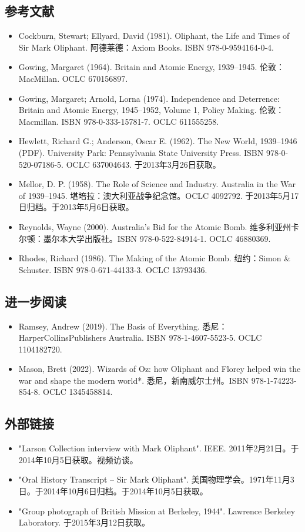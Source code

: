 \subsection{参考文献}
\begin{itemize}
\item Cockburn, Stewart; Ellyard, David (1981). Oliphant, the Life and Times of Sir Mark Oliphant. 阿德莱德：Axiom Books. ISBN 978-0-9594164-0-4.
\item Gowing, Margaret (1964). Britain and Atomic Energy, 1939–1945. 伦敦：MacMillan. OCLC 670156897.
\item Gowing, Margaret; Arnold, Lorna (1974). Independence and Deterrence: Britain and Atomic Energy, 1945–1952, Volume 1, Policy Making. 伦敦：Macmillan. ISBN 978-0-333-15781-7. OCLC 611555258.
\item Hewlett, Richard G.; Anderson, Oscar E. (1962). The New World, 1939–1946 (PDF). University Park: Pennsylvania State University Press. ISBN 978-0-520-07186-5. OCLC 637004643. 于2013年3月26日获取。
\item Mellor, D. P. (1958). The Role of Science and Industry. Australia in the War of 1939–1945. 堪培拉：澳大利亚战争纪念馆。OCLC 4092792. 于2013年5月17日归档。于2013年5月6日获取。
\item Reynolds, Wayne (2000). Australia's Bid for the Atomic Bomb. 维多利亚州卡尔顿：墨尔本大学出版社。ISBN 978-0-522-84914-1. OCLC 46880369.
\item Rhodes, Richard (1986). The Making of the Atomic Bomb. 纽约：Simon & Schuster. ISBN 978-0-671-44133-3. OCLC 13793436.
\end{itemize}
\subsection{进一步阅读}
\begin{itemize}
\item Ramsey, Andrew (2019). The Basis of Everything. 悉尼：HarperCollinsPublishers Australia. ISBN 978-1-4607-5523-5. OCLC 1104182720.
\item Mason, Brett (2022). Wizards of Oz: how Oliphant and Florey helped win the war and shape the modern world*. 悉尼，新南威尔士州。ISBN 978-1-74223-854-8. OCLC 1345458814.
\end{itemize}
\subsection{外部链接}
\begin{itemize}
\item  "Larson Collection interview with Mark Oliphant". IEEE. 2011年2月21日。于2014年10月5日获取。视频访谈。
\item "Oral History Transcript – Sir Mark Oliphant". 美国物理学会。1971年11月3日。于2014年10月6日归档。于2014年10月5日获取。
\item "Group photograph of British Mission at Berkeley, 1944". Lawrence Berkeley Laboratory. 于2015年3月12日获取。
\end{itemize}
